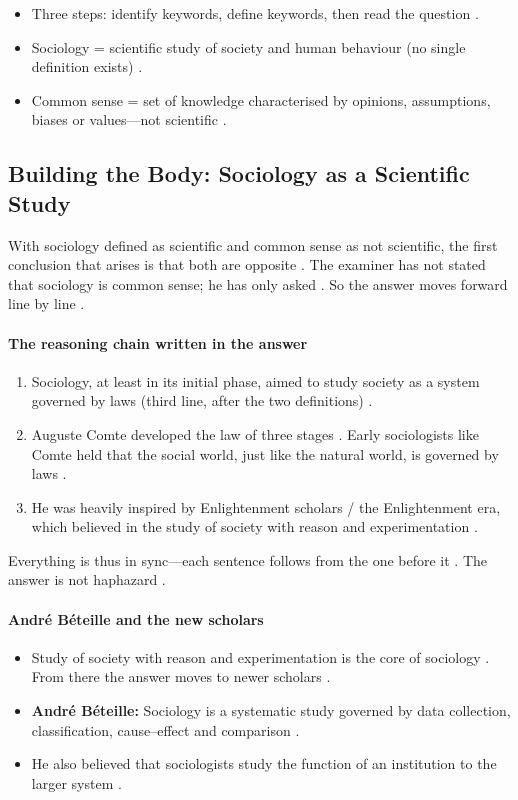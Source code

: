 \begin{QuickRevision}
\begin{itemize}
    \item Three steps: identify keywords, define keywords, then read the question .
    \item Sociology = scientific study of society and human behaviour (no single definition exists) .
    \item Common sense = set of knowledge characterised by opinions, assumptions, biases or values---not scientific .
\end{itemize}
\end{QuickRevision}

\subsection{Building the Body: Sociology as a Scientific Study}
With sociology defined as scientific and common sense as not scientific, the first conclusion that arises is that both are opposite . The examiner has not stated that sociology is common sense; he has only asked . So the answer moves forward line by line .

\paragraph{The reasoning chain written in the answer}
\begin{enumerate}
    \item Sociology, at least in its initial phase, aimed to study society as a system governed by laws (third line, after the two definitions) .
    \item Auguste Comte developed the law of three stages . Early sociologists like Comte held that the social world, just like the natural world, is governed by laws .
    \item He was heavily inspired by Enlightenment scholars / the Enlightenment era, which believed in the study of society with reason and experimentation .
\end{enumerate}
Everything is thus in sync---each sentence follows from the one before it . The answer is not haphazard .

\paragraph{André Béteille and the new scholars}
\begin{itemize}
    \item Study of society with reason and experimentation is the core of sociology . From there the answer moves to newer scholars .
    \item \textbf{André Béteille:} Sociology is a systematic study governed by data collection, classification, cause--effect and comparison .
    \item He also believed that sociologists study the function of an institution to the larger system .
\end{itemize}

